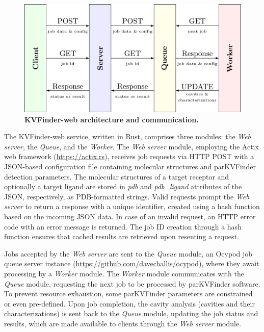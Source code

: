 \documentclass[Ingles]{phdthesis}
\begin{document}
\begin{figure}[h]
  \centering
  \includegraphics[scale=1.5]{images/web-queue-worker-architecture.png}
  \caption[KVFinder-web service architecture and communication]{\textbf{KVFinder-web architecture and communication.}}
  \label{fig:kvweb-service-architecture}
\end{figure}

The KVFinder-web service, written in Rust, comprises three modules: the \textit{Web server}, the \textit{Queue}, and the \textit{Worker}. The \textit{Web server} module, employing the Actix web framework (\url{https://actix.rs}), receives job requests via HTTP POST with a JSON-based configuration file containing molecular structures and parKVFinder detection parameters. The molecular structures of a target receptor and optionally a target ligand are stored in \textit{pdb} and \textit{pdb\_ligand} attributes of the JSON, respectively, as \acs{PDB}-formatted strings. Valid requests prompt the \textit{Web server} to return a response with a unique identifier, created using a hash function based on the incoming JSON data. In case of an invalid request, an HTTP error code with an error message is returned. The job ID creation through a hash function ensures that cached results are retrieved upon resenting a request.

Jobs accepted by the \textit{Web server} are sent to the \textit{Queue} module, an Ocypod job queue server instance (\url{https://github.com/davechallis/ocypod}), where they await processing by a \textit{Worker} module. The \textit{Worker} module communicates with the \textit{Queue} module, requesting the next job to be processed by parKVFinder software. To prevent resource exhaustion, some parKVFinder parameters are constrained or even pre-defined. Upon job completion, the cavity analysis (cavities and their characterizations) is sent back to the \textit{Queue} module, updating the job status and results, which are made available to clients through the \textit{Web server} module. 
\end{document}
